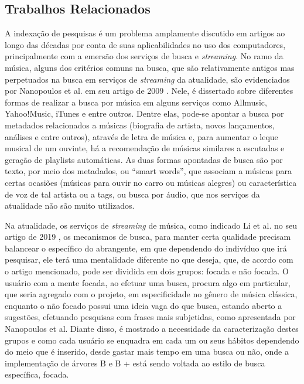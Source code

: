 \documentclass[12pt]{article}
\begin{document}
\subsection{Trabalhos Relacionados}

A indexação de pesquisas é um problema amplamente discutido em artigos ao longo
das décadas por conta de suas aplicabilidades no uso dos computadores,
principalmente com a emersão dos serviços de busca e \emph{streaming}. No ramo
da música, alguns dos critérios comuns na busca, que são relativamente antigos
mas perpetuados na busca em serviços de \emph{streaming} da atualidade, são
evidenciados por  Nanopoulos et al. em seu artigo de 2009 \cite{NaRaRuMa:09}.
Nele, é dissertado sobre diferentes formas de realizar a busca por música em
alguns serviços como Allmusic, Yahoo!Music, iTunes e entre outros. Dentre elas,
pode-se apontar a busca por metadados relacionados a músicas (biografia de
artista, novos lançamentos, análises e entre outros), através de letra de música
e, para aumentar o leque musical de um ouvinte, há a recomendação de músicas
similares a escutadas e geração de playlists automáticas. As duas formas
apontadas de busca são por texto, por meio dos metadados, ou “smart words”, que
associam a músicas para certas ocasiões (músicas para ouvir no carro ou músicas
alegres) ou característica de voz de tal artista ou a tags, ou busca por áudio,
que nos serviços da atualidade não são muito utilizados.

Na atualidade, os serviços de \emph{streaming} de música, como indicado Li et
al. no seu artigo de 2019 \cite{LiThChToGa:19}, os mecanismos de busca, para
manter certa qualidade precisam balancear o específico do abrangente, em que
dependendo do indivíduo que irá pesquisar, ele terá uma mentalidade diferente no
que deseja, que, de acordo com o artigo mencionado, pode ser dividida em dois
grupos: focada e não focada. O usuário com a mente focada, ao efetuar uma busca,
procura algo em particular, que seria agregado com o projeto, em especificidade
no gênero de música clássica, enquanto o não focado possui uma ideia vaga do que
busca, estando aberto a sugestões, efetuando pesquisas com frases mais
subjetidas, como apresentada por Nanopoulos et al. Diante disso, é mostrado a
necessidade da caracterização destes grupos e como cada usuário se enquadra em
cada um ou seus hábitos dependendo do meio que é inserido, desde gastar mais
tempo em uma busca ou não, onde a implementação de árvores B e B + está sendo
voltada ao estilo de busca específica, focada.
\end{document}
